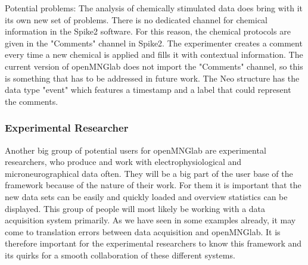 Potential problems: The analysis of chemically stimulated data does bring with it its own new set of problems. There is no dedicated channel for chemical information in the Spike2 software. For this reason, the chemical protocols are given in the "Comments" channel in Spike2. The experimenter creates a comment every time a new chemical is applied and fills it with contextual information. The current version of openMNGlab does not import the "Comments" channel, so this is something that has to be addressed in future work. The Neo structure has the data type "event" which features a timestamp and a label that could represent the comments.

\subsubsection{Experimental Researcher}
Another big group of potential users for openMNGlab are experimental researchers, who produce and work with electrophysiological and microneurographical data often. They will be a big part of the user base of the framework because of the nature of their work. For them it is important that the new data sets can be easily and quickly loaded and overview statistics can be displayed. This group of people will most likely be working with a data acquisition system primarily. As we have seen in some examples already, it may come to translation errors between data acquisition and openMNGlab. It is therefore important for the experimental researchers to know this framework and its quirks for a smooth collaboration of these different systems.

